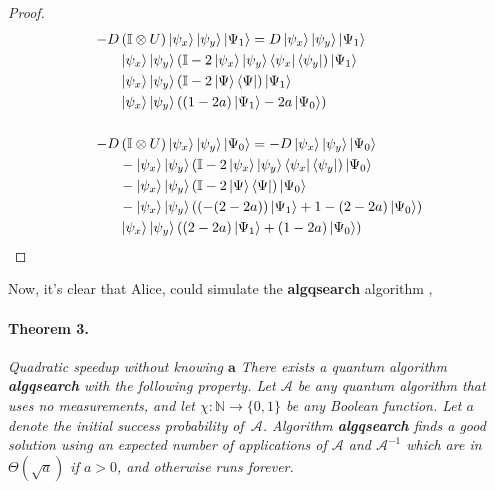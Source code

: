 \documentclass{article}
\begin{document}
\begin{proof}
    \begin{equation*}
      \begin{split}
    - D & \left( \mathbb{I} \otimes U \right)  \ket{\psi_{x}}\ket{\psi_{y}} \ket{\Psi_1} =    D  \ket{\psi_{x}}\ket{\psi_{y}} \ket{\Psi_1} \\
  &  \ket{\psi_{x}}\ket{\psi_{y}} \left( \mathbb{I} - 2 \ket{\psi_{x}}\ket{\psi_{y}} \bra{ \psi_{x}}\bra{\psi_{y}} \right) \ket{\Psi_1} \\
  &  \ket{\psi_{x}}\ket{\psi_{y}} \left( \mathbb{I} - 2 \ket{\Psi} \bra{\Psi} \right) \ket{\Psi_1}  \\ 
  &  \ket{\psi_{x}}\ket{\psi_{y}} \left( \left( 1 - 2a  \right)\ket{\Psi_1} - 2a \ket{\Psi_0} \right) \\ 
  & \\ 
  - D & \left( \mathbb{I} \otimes U \right)  \ket{\psi_{x}}\ket{\psi_{y}} \ket{\Psi_0} =   - D  \ket{\psi_{x}}\ket{\psi_{y}} \ket{\Psi_0} \\
  &  - \ket{\psi_{x}}\ket{\psi_{y}} \left( \mathbb{I} - 2 \ket{\psi_{x}}\ket{\psi_{y}} \bra{ \psi_{x}}\bra{\psi_{y}} \right) \ket{\Psi_0} \\
  &  - \ket{\psi_{x}}\ket{\psi_{y}} \left( \mathbb{I} - 2 \ket{\Psi} \bra{\Psi} \right) \ket{\Psi_0} \\ 
  &  - \ket{\psi_{x}}\ket{\psi_{y}} \left( \left(  - (2-2a)  \right)\ket{\Psi_1} + 1 -(2 - 2a) \ket{\Psi_0} \right) \\ 
  & \ket{\psi_{x}}\ket{\psi_{y}} \left( \left( 2-2a \right)\ket{\Psi_1} + \left(1  - 2a\right) \ket{\Psi_0} \right) 
\end{split}
\end{equation*}
\end{proof}
Now, it's clear that Alice, could simulate the \textbf{algqsearch} algorithm \cite{Brassard_2002}, 

\paragraph{Theorem 3.} \textit{Quadratic speedup without knowing $\mathbf{a}$
There exists a quantum algorithm \textbf{algqsearch} with the following property.
Let $\mathcal A$ be any quantum algorithm that uses no measurements,
and let $\chi : \mathbb{N}  \rightarrow \{0,1\}$ be any Boolean function.
Let $a$ denote the initial success probability of~$\mathcal A$.
Algorithm \textbf{algqsearch} finds a good solution using an expected number
of applications of $\mathcal A$ and ${\mathcal A}^{-1}$ which are in
$\Theta(\sqrt a)$ if $a>0$, and otherwise runs forever.}
\end{document}
